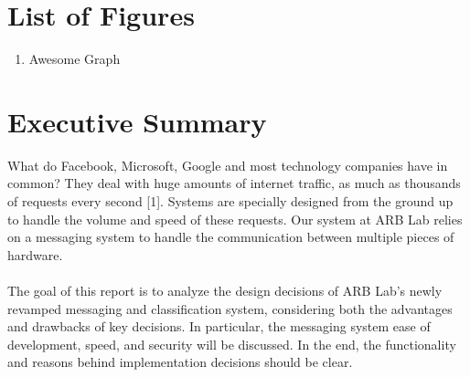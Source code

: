 \documentclass[12pt]{report}
\begin{document}
\newpage\thispagestyle{fancy}\sectionfont{\scshape}
\section*{List of Figures}
\normalsize{}
\begin{enumerate}[label=\arabic*,leftmargin=*,labelsep=2ex,ref=\arabic*]
    \item Awesome Graph 
\end{enumerate}


\newpage\thispagestyle{fancy}\sectionfont{\scshape}
\section*{Executive Summary}
What do Facebook, Microsoft, Google and most technology companies have in common? They deal with huge amounts of internet traffic, as much as thousands of requests every second [1]. Systems are specially designed from the ground up to handle the volume and speed of these requests. Our system at ARB Lab relies on a messaging system to handle the communication between multiple pieces of hardware. \\ \\ \noindent
The goal of this report is to analyze the design decisions of ARB Lab's newly revamped messaging and classification system, considering both the advantages and drawbacks of key decisions. In particular, the messaging system ease of development, speed, and security will be discussed. In the end, the functionality and reasons behind implementation decisions should be clear.



\newpage\thispagestyle{fancy}\sectionfont{\scshape}

\setcounter{page}{1}
\fancyfoot[C]{\thepage}
\end{document}
